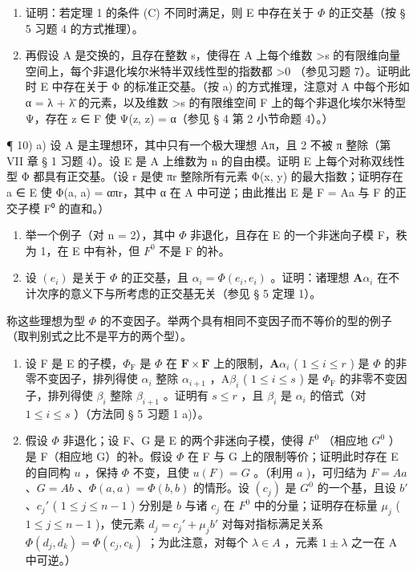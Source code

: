 \begin{enumerate}
\def\labelenumi{\alph{enumi})}
\item
  证明：若定理 1 的条件 (C) 不同时满足，则 E 中存在关于 \(\Phi\) 的正交基（按 § 5 习题 4 的方式推理）。
\item
  再假设 A 是交换的，且存在整数 s，使得在 A 上每个维数 \textgreater s 的有限维向量空间上，每个非退化埃尔米特半双线性型的指数都 \textgreater0 （参见习题 7）。证明此时 E 中存在关于 Φ 的标准正交基。（按 a) 的方式推理，注意对 A 中每个形如 α = λ + λ̄ 的元素，以及维数 \textgreater s 的有限维空间 F 上的每个非退化埃尔米特型 Ψ，存在 z ∈ F 使 Ψ(z, z) = α（参见 § 4 第 2 小节命题 4）。）
\end{enumerate}

¶ 10) a) 设 A 是主理想环，其中只有一个极大理想 Aπ，且 2 不被 π 整除（第 VII 章 § 1 习题 4）。设 E 是 A 上维数为 n 的自由模。证明 E 上每个对称双线性型 Φ 都具有正交基。（设 r 是使 πr 整除所有元素 Φ(x, y) 的最大指数；证明存在 a ∈ E 使 Φ(a, a) = απr，其中 α 在 A 中可逆；由此推出 E 是 F = Aa 与 F 的正交子模 F⁰ 的直和。）

\begin{enumerate}
\def\labelenumi{\alph{enumi})}
\setcounter{enumi}{1}
\item
  举一个例子（对 n = 2），其中 \(\Phi\) 非退化，且存在 E 的一个非迷向子模 F，秩为 1，在 E 中有补，但 \(F^{0}\) 不是 F 的补。
\item
  设 \((e_i)\) 是关于 \(\Phi\) 的正交基，且 \(\alpha_i = \Phi(e_i, e_i)\) 。证明：诸理想 \(\mathbf{A}\alpha_i\) 在不计次序的意义下与所考虑的正交基无关（参见 § 5 定理 1）。
\end{enumerate}

称这些理想为型 \(\Phi\) 的不变因子。举两个具有相同不变因子而不等价的型的例子（取判别式之比不是平方的两个型）。

\begin{enumerate}
\def\labelenumi{\alph{enumi})}
\setcounter{enumi}{3}
\item
  设 F 是 E 的子模，\(\Phi_{\mathrm{F}}\) 是 \(\Phi\) 在 \(\mathbf{F} \times \mathbf{F}\) 上的限制，\(\mathbf{A}\alpha_{i}\) ( \(1 \leqslant i \leqslant r\) ) 是 \(\Phi\) 的非零不变因子，排列得使 \(\alpha_{i}\) 整除 \(\alpha_{i+1}\) ，\(\mathrm{A}\beta_{i}\) ( \(1 \leqslant i \leqslant s\) ) 是 \(\Phi_{\mathrm{F}}\) 的非零不变因子，排列得使 \(\beta_{i}\) 整除 \(\beta_{i+1}\) 。证明有 \(s \leqslant r\) ，且 \(\beta_{i}\) 是 \(\alpha_{i}\) 的倍式（对 \(1 \leqslant i \leqslant s\) ）（方法同 § 5 习题 1 a)）。
\item
  假设 \(\Phi\) 非退化；设 F、G 是 E 的两个非迷向子模，使得 \(F^{0}\) （相应地 \(G^{0}\) ）是 F（相应地 G）的补。假设 \(\Phi\) 在 F 与 G 上的限制等价；证明此时存在 E 的自同构 \(u\) ，保持 \(\Phi\) 不变，且使 \(u(F) = G\) 。（利用 \(a\) )，可归结为 \(F = Aa\) 、\(G = Ab\) 、\(\Phi(a, a) = \Phi(b, b)\) 的情形。设 \((c_{j})\) 是 \(G^{0}\) 的一个基，且设 \(b'\) 、\(c_{j}'\) ( \(1 \leqslant j \leqslant n - 1\) ) 分别是 \(b\) 与诸 \(c_{j}\) 在 \(F^{0}\) 中的分量；证明存在标量 \(\mu_{j}\) ( \(1 \leqslant j \leqslant n - 1\) )，使元素 \(d_{j} = c_{j}' + \mu_{j}b'\) 对每对指标满足关系 \(\Phi(d_{j}, d_{k}) = \Phi(c_{j}, c_{k})\) ；为此注意，对每个 \(\lambda \in A\) ，元素 \(1 \pm \lambda\) 之一在 A 中可逆。）
\end{enumerate}

